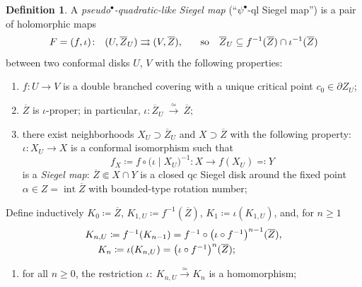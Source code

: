 \documentclass[11pt, reqno]{amsart}
\numberwithin{equation}{section}
\theoremstyle{plain}
\theoremstyle{theorem}
\theoremstyle{plain}
\theoremstyle{definition}
\newtheorem{defn}[theorem]{Definition}
\numberwithin{figure}{section}
\renewcommand{\sp}{{\ \ }}
\newcommand\intr{\operatorname{int}}
\begin{document}
\begin{defn}
\label{dfn:psi:Siegel:ql}
A {\em  pseudo${}^\bullet$-quadratic-like Siegel map} (``$\psi^\bullet$-ql Siegel map'') 
is a pair of holomorphic  maps
\begin{equation}
\label{eq:dfn:psib-ql}
F=(f,\iota)\colon \sp ( U, \overline Z_U)  \rightrightarrows (V, \overline Z ),\hspace{0.5cm}\text{ so }\sp  \overline Z_U \subseteq f^{-1}(\overline Z) \cap  \iota^{-1}(\overline Z) 
\end{equation} between two conformal  disks $U$, $V$
with the following properties:


\begin{enumerate}[label=\text{(\Roman*)},font=\normalfont,leftmargin=*]
\item\label{dfn:psib-ql:1}  $f\colon U\to V$ is a double branched covering with a unique critical point $c_0\in \partial Z_U$;

\item \label{dfn:psib-ql:2} $\overline Z$ is $\iota$-proper; in particular, $\iota \colon \overline Z_U\ \overset{\simeq}\longrightarrow \ \overline Z;$

\item \label{dfn:psib-ql:3}
 there exist neighborhoods $X_U\supset \overline Z _U$ and $X \supset \overline Z$ with the following property: $\iota: X_U \to X$ is a conformal isomorphism such that
\begin{equation}\label{eq:dfn:ql b domain}
f_X\coloneqq f\circ \big(\iota\mid X_U\big)^{-1} : X \to f(X_U)\eqqcolon Y 
\end{equation} 
 is a \emph{Siegel map}: $\overline Z \Subset X\cap Y$ is a closed qc Siegel disk around the fixed point $\alpha \in Z=\intr \overline Z$ with bounded-type rotation number;

\end{enumerate}
Define inductively $K_0\coloneqq \overline Z$, $K_{1, U}\coloneqq f^{-1}(\overline Z)$, $K_{1}\coloneqq\iota(K_{1, U})$,  and, for $n\ge 1$   
\begin{equation}
\label{eq:C:dfn:K_n}
\begin{matrix} K_{n,U}\coloneqq f^{-1}(K_{n-1})=f^{-1}\circ \big(\iota \circ f^{-1}\big)^{n-1} (\overline Z), \vspace{0.1cm}\\ K_n \coloneqq \iota(K_{n,U})=\big(\iota \circ f^{-1}\big)^n (\overline Z);\hspace{1.2cm} \end{matrix}
\end{equation}
\begin{enumerate}[label=\text{(\Roman*)},font=\normalfont,leftmargin=*,start=4]
\item  \label{dfn:psib-ql:4} for all $n\ge 0$, the restriction
$\iota \colon \ K_{n,U} \overset{\simeq}{\longrightarrow} K_n $ is a homomorphism;


\end{enumerate}
\end{defn}
\end{document}
